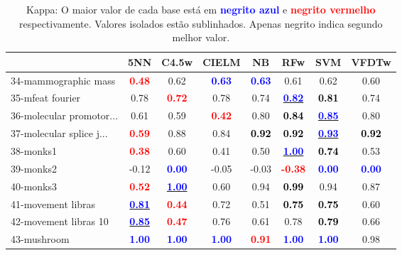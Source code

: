 \begin{table}[h]
\caption{Kappa: O maior valor de cada base está em \textcolor{blue}{\textbf{negrito azul}} e \textcolor{red}{\textbf{negrito vermelho}} respectivamente. Valores isolados estão sublinhados. Apenas negrito indica segundo melhor valor.}
\begin{center}\begin{tabular}{lc|c|c|c|c|c|c}
 & 5NN & C4.5w & CIELM & NB & RFw & SVM & VFDTw\\ \hline 34-mammographic mass & \textcolor{red}{\textbf{  0.48}} &   0.62 & \textcolor{blue}{\textbf{  0.63}} & \textcolor{blue}{\textbf{  0.63}} &   0.61 &   0.62 &   0.60 \\
35-mfeat fourier &   0.78 & \textcolor{red}{\textbf{  0.72}} &   0.78 &   0.74 & \underline{\textcolor{blue}{\textbf{  0.82}}} & \textcolor{black}{\textbf{  0.81}} &   0.74 \\
36-molecular promotor... &   0.61 &   0.59 & \textcolor{red}{\textbf{  0.42}} &   0.80 & \textcolor{black}{\textbf{  0.84}} & \underline{\textcolor{blue}{\textbf{  0.85}}} &   0.80 \\
37-molecular splice j... & \textcolor{red}{\textbf{  0.59}} &   0.88 &   0.84 & \textcolor{black}{\textbf{  0.92}} & \textcolor{black}{\textbf{  0.92}} & \underline{\textcolor{blue}{\textbf{  0.93}}} & \textcolor{black}{\textbf{  0.92}} \\
38-monks1 & \textcolor{red}{\textbf{  0.38}} &   0.60 &   0.41 &   0.50 & \underline{\textcolor{blue}{\textbf{  1.00}}} & \textcolor{black}{\textbf{  0.74}} &   0.53 \\ \hline
39-monks2 &  -0.12 & \textcolor{blue}{\textbf{  0.00}} &  -0.05 &  -0.03 & \textcolor{red}{\textbf{ -0.38}} & \textcolor{blue}{\textbf{  0.00}} & \textcolor{blue}{\textbf{  0.00}} \\
40-monks3 & \textcolor{red}{\textbf{  0.52}} & \underline{\textcolor{blue}{\textbf{  1.00}}} &   0.60 &   0.94 & \textcolor{black}{\textbf{  0.99}} &   0.94 &   0.87 \\
41-movement libras & \underline{\textcolor{blue}{\textbf{  0.81}}} & \textcolor{red}{\textbf{  0.44}} &   0.72 &   0.51 & \textcolor{black}{\textbf{  0.75}} & \textcolor{black}{\textbf{  0.75}} &   0.60 \\
42-movement libras 10 & \underline{\textcolor{blue}{\textbf{  0.85}}} & \textcolor{red}{\textbf{  0.47}} &   0.76 &   0.61 &   0.78 & \textcolor{black}{\textbf{  0.79}} &   0.66 \\
43-mushroom & \textcolor{blue}{\textbf{  1.00}} & \textcolor{blue}{\textbf{  1.00}} & \textcolor{blue}{\textbf{  1.00}} & \textcolor{red}{\textbf{  0.91}} & \textcolor{blue}{\textbf{  1.00}} & \textcolor{blue}{\textbf{  1.00}} &   0.98 \\ \hline

\end{tabular}
\end{center}
\end{table}
